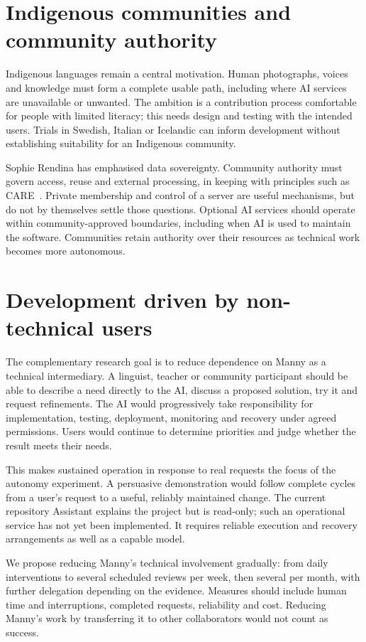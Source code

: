 \documentclass[11pt,a4paper]{article}
\begin{document}
\section{Indigenous communities and community authority}
Indigenous languages remain a central motivation. Human photographs, voices
and knowledge must form a complete usable path, including where AI services
are unavailable or unwanted. The ambition is a contribution process comfortable
for people with limited literacy; this needs design and testing with the
intended users. Trials in Swedish, Italian or Icelandic can inform development
without establishing suitability for an Indigenous community.

Sophie Rendina has emphasised data sovereignty. Community authority must govern
access, reuse and external processing, in keeping with principles such as
CARE~\cite{care}. Private membership and control of a server are useful
mechanisms, but do not by themselves settle those questions. Optional AI
services should operate within community-approved boundaries, including when
AI is used to maintain the software. Communities retain authority over their
resources as technical work becomes more autonomous.

\section{Development driven by non-technical users}
The complementary research goal is to reduce dependence on Manny as a technical
intermediary. A linguist, teacher or community participant should be able to
describe a need directly to the AI, discuss a proposed solution, try it and
request refinements. The AI would progressively take responsibility for
implementation, testing, deployment, monitoring and recovery under agreed
permissions. Users would continue to determine priorities and judge whether
the result meets their needs.

This makes sustained operation in response to real requests the focus of the
autonomy experiment. A persuasive demonstration would follow complete cycles
from a user's request to a useful, reliably maintained change. The current
repository Assistant explains the project but is read-only; such an operational
service has not yet been implemented. It requires reliable execution and
recovery arrangements as well as a capable model.

We propose reducing Manny's technical involvement gradually: from daily
interventions to several scheduled reviews per week, then several per month,
with further delegation depending on the evidence. Measures should include
human time and interruptions, completed requests, reliability and cost.
Reducing Manny's work by transferring it to other collaborators would not
count as success.
\end{document}
